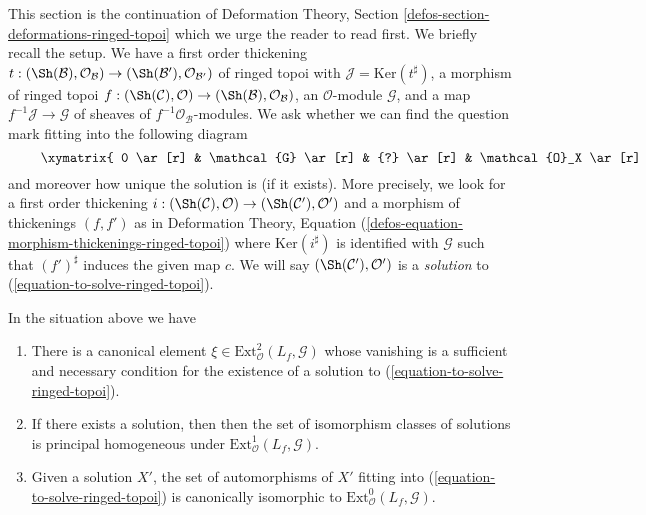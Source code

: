 \noindent
This section is the continuation of
Deformation Theory, Section \ref{defos-section-deformations-ringed-topoi}
which we urge the reader to read first. We briefly recall the setup.
We have a first order thickening
$t : (\Sh(\mathcal{B}), \mathcal{O}_\mathcal{B}) \to
(\Sh(\mathcal{B}'), \mathcal{O}_{\mathcal{B}'})$ of ringed topoi
with $\mathcal{J} = \text{Ker}(t^\sharp)$, a morphism of ringed topoi
$f : (\Sh(\mathcal{C}), \mathcal{O}) \to
(\Sh(\mathcal{B}), \mathcal{O}_\mathcal{B})$, an $\mathcal{O}$-module
$\mathcal{G}$, and a map $f^{-1}\mathcal{J} \to \mathcal{G}$
of sheaves of $f^{-1}\mathcal{O}_\mathcal{B}$-modules.
We ask whether we can find
the question mark fitting into the following diagram
\begin{equation}
\label{equation-to-solve-ringed-topoi}
\vcenter{
\xymatrix{
0 \ar[r] & \mathcal{G} \ar[r] & {?} \ar[r] & \mathcal{O}_X \ar[r] & 0 \\
0 \ar[r] & f^{-1}\mathcal{J} \ar[u]^c \ar[r] &
f^{-1}\mathcal{O}_{S'} \ar[u] \ar[r] &
f^{-1}\mathcal{O}_S \ar[u] \ar[r] & 0
}
}
\end{equation}
and moreover how unique the solution is (if it exists). More precisely,
we look for a first order thickening
$i : (\Sh(\mathcal{C}), \mathcal{O}) \to (\Sh(\mathcal{C}'), \mathcal{O}')$
and a morphism of thickenings $(f, f')$ as in
Deformation Theory, Equation
(\ref{defos-equation-morphism-thickenings-ringed-topoi})
where $\text{Ker}(i^\sharp)$ is identified with $\mathcal{G}$
such that $(f')^\sharp$ induces the given map $c$.
We will say $(\Sh(\mathcal{C}'), \mathcal{O}')$ is a {\it solution} to
(\ref{equation-to-solve-ringed-topoi}).

\begin{lemma}
\label{lemma-find-obstruction-ringed-topoi}
In the situation above we have
\begin{enumerate}
\item There is a canonical element
$\xi \in \text{Ext}^2_\mathcal{O}(L_f, \mathcal{G})$
whose vanishing is a sufficient and necessary condition for the existence
of a solution to (\ref{equation-to-solve-ringed-topoi}).
\item If there exists a solution, then then the set of
isomorphism classes of solutions is principal homogeneous under
$\text{Ext}^1_\mathcal{O}(L_f, \mathcal{G})$.
\item Given a solution $X'$, the set of automorphisms of $X'$
fitting into (\ref{equation-to-solve-ringed-topoi}) is canonically isomorphic
to $\text{Ext}^0_\mathcal{O}(L_f, \mathcal{G})$.
\end{enumerate}
\end{lemma}

